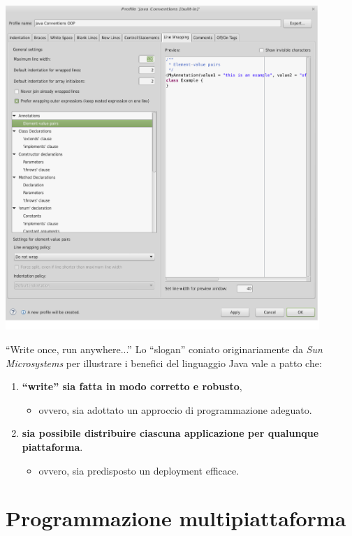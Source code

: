 \documentclass[presentation]{beamer}
\begin{document}
 {
	\centering
	\includegraphics[width=0.89\textwidth]{img/ideconf-4}
}

\begin{frame}{``Write once, run anywhere...''}
Lo ``slogan'' coniato originariamente da \textit{Sun Microsystems} per illustrare i benefici del linguaggio Java vale a patto che:

\begin{enumerate}\itemsep10pt
\item \textbf{``write'' sia fatta in modo corretto e robusto},
\begin{itemize}
\item ovvero, sia adottato un approccio di programmazione adeguato.
\end{itemize}
\item \textbf{sia possibile distribuire ciascuna applicazione per qualunque piattaforma}.
\begin{itemize}
\item ovvero, sia predisposto un deployment efficace. 
\end{itemize}
\end{enumerate}
\end{frame}

\section{Programmazione multipiattaforma}
\end{document}
